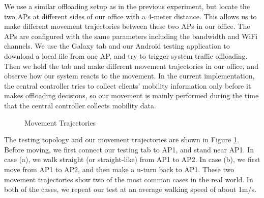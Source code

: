 \documentclass[english]{tktltiki}
\begin{document}
We use a similar offloading setup as in the previous experiment, but locate the two APs at different sides of our office with a 4-meter distance. This allows us to make different movement trajectories between these two APs in our office. The APs are configured with the same parameters including the bandwidth and WiFi channels. We use the Galaxy tab and our Android testing application to download a local file from one AP, and try to trigger system traffic offloading. Then we hold the tab and make different movement trajectories in our office, and observe how our system reacts to the movement. In the current implementation, the central controller tries to collect clients' mobility information only before it makes offloading decisions, so our movement is mainly performed during the time that the central controller collects mobility data.

\begin{figure}[htbp]
  \centering
  \hspace{10 pt}%
  \caption{Movement Trajectories}
  \label{fig:mobility}
\end{figure}

The testing topology and our movement trajectories are shown in Figure \ref{fig:mobility}. Before moving, we first connect our testing tab to AP1, and stand near AP1. In case (a), we walk straight (or straight-like) from AP1 to AP2. In case (b), we first move from AP1 to AP2, and then make a u-turn back to AP1. These two movement trajectories show two of the most common cases in the real world. In both of the cases, we repeat our test at an average walking speed of about 1m/s. 
\end{document}
